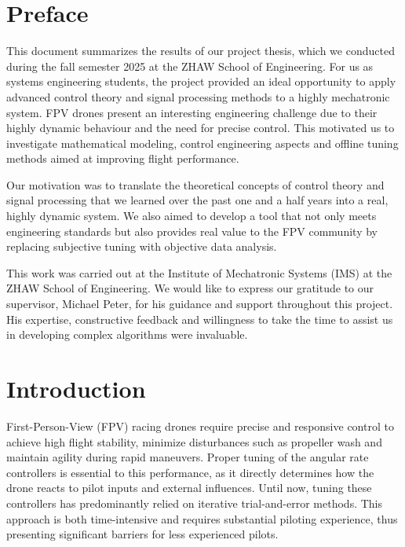 \documentclass[a4paper,11pt]{scrartcl}
\begin{document}
\clearpage

\section{Preface}
This document summarizes the results of our project thesis, which we conducted during the fall semester 2025 at the ZHAW School of Engineering.
For us as systems engineering students, the project provided an ideal opportunity to apply advanced control theory and signal processing methods
to a highly mechatronic system. FPV drones present an interesting engineering challenge due to their highly dynamic behaviour and the need for
precise control. This motivated us to investigate mathematical modeling, control engineering aspects and
offline tuning methods aimed at improving flight performance. \par
Our motivation was to translate the theoretical concepts of control theory and signal processing that we learned over the past one and a half years into a real, highly dynamic system. We also aimed to develop a tool that not only meets engineering standards but also
provides real value to the FPV community by replacing subjective tuning with objective data analysis. \par
This work was carried out at the Institute of Mechatronic Systems (IMS) at the ZHAW School of Engineering. We
would like to express our gratitude to our supervisor, Michael Peter, for his guidance and support throughout
this project. His expertise, constructive feedback and willingness to take the time to assist us in developing
complex algorithms were invaluable.

\clearpage

\tableofcontents

\clearpage

\section{Introduction}
\label{Introduction}
First-Person-View (FPV) racing drones require precise and responsive control to achieve high flight stability, minimize disturbances such as propeller wash and maintain agility during rapid maneuvers. Proper tuning of the angular rate controllers is essential to this performance, as it directly determines how the drone reacts to pilot inputs and external influences. Until now, tuning these controllers has predominantly relied on iterative trial-and-error methods. This approach is both time-intensive and requires substantial piloting experience, thus presenting significant barriers for less experienced pilots.
\end{document}
